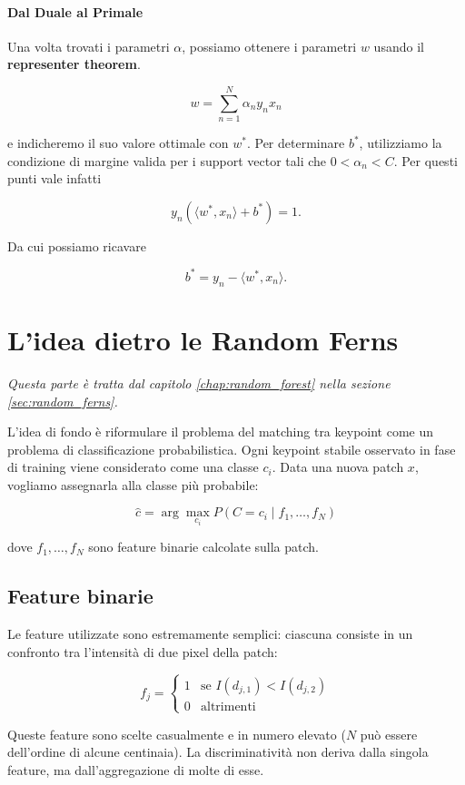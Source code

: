 \paragraph{Dal Duale al Primale} Una volta trovati i parametri $\alpha$, possiamo ottenere i parametri $w$ usando il \textbf{representer theorem}.

$$
w = \sum_{n=1}^{N} \alpha_n y_n x_n
$$

e indicheremo il suo valore ottimale con $w^*$. 
Per determinare $b^*$, utilizziamo la condizione di margine
valida per i support vector tali che $0 < \alpha_n < C$.
Per questi punti vale infatti

\[
y_n(\langle w^*, x_n\rangle + b^*) = 1.
\]

Da cui possiamo ricavare

\[
b^* = y_n - \langle w^*, x_n\rangle.
\]

\section{L'idea dietro le Random Ferns}\label{sec:random_ferns_idea}
\textit{Questa parte è tratta dal capitolo \ref{chap:random_forest} nella sezione \ref{sec:random_ferns}.}

\bigskip
\noindent
L’idea di fondo è riformulare il problema del matching tra keypoint come un problema di classificazione probabilistica. 
Ogni keypoint stabile osservato in fase di training viene considerato come una classe $c_i$. 
Data una nuova patch $x$, vogliamo assegnarla alla classe più probabile:

\[
\hat{c} = \arg\max_{c_i} P(C = c_i \mid f_1, \dots, f_N)
\]

dove $f_1, \dots, f_N$ sono feature binarie calcolate sulla patch.

\subsection{Feature binarie}

Le feature utilizzate sono estremamente semplici: ciascuna consiste in un confronto tra l’intensità di due pixel della patch:

\[
f_j =
\begin{cases}
1 & \text{se } I(d_{j,1}) < I(d_{j,2}) \\
0 & \text{altrimenti}
\end{cases}
\]

Queste feature sono scelte casualmente e in numero elevato ($N$ può essere dell’ordine di alcune centinaia). 
La discriminatività non deriva dalla singola feature, ma dall’aggregazione di molte di esse.

